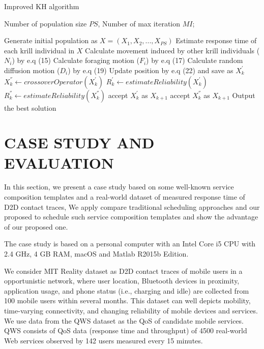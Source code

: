 \documentclass[journal]{IEEEtran}
\begin{document}
\begin{algorithm}
\caption{Improved KH algorithm}
\label{alg2}
\begin{algorithmic}[1]

\REQUIRE Number of population size $PS$, Number of max iteration $MI$;

\STATE Generate initial population as $X = (X_1, X_2, ..., X_{PS})$
\STATE Estimate response time of each krill individual in $X$
    \STATE Calculate movement induced by other krill individuals ($N_i$) by e.q (15)
    \STATE Calculate foraging motion ($F_i$) by e.q (17)
    \STATE Calculate random diffusion motion ($D_i$) by e.q (19)
    \STATE Update position by e.q (22) and save as $X_k^{'}$
    \STATE $X_k^{''} \leftarrow crossoverOperator(X_k^{'})$
    \STATE $R_k^{'} \leftarrow estimateReliability(X_k^{'})$
    \STATE $R_k^{''} \leftarrow estimateReliability(X_k^{''})$
      \STATE accept $X_k^{'}$ as $X_{k+1}$
    \ELSE
      \STATE accept $X_k^{''}$ as $X_{k+1}$
    \ENDIF
  \ENDFOR
\ENDFOR
\STATE Output the best solution
\end{algorithmic}
\end{algorithm}



\section{CASE STUDY AND EVALUATION}
In this section, we present a case study based on some well-known service composition templates and a real-world dataset of measured response time of D2D contact traces, We apply compare traditional scheduling approaches and our proposed to schedule such service composition templates and show the advantage of our proposed one.

The case study is based on a personal computer with an Intel Core i5 CPU with 2.4 GHz, 4 GB RAM, macOS and Matlab R2015b Edition.

We consider MIT Reality dataset \cite{eagle2006reality} as D2D contact traces of mobile users in a opportunistic network, where user location, Bluetooth devices in proximity, application usage, and phone status (i.e., charging and idle) are collected from 100 mobile users within several months. This dataset can well depicts mobility, time-varying connectivity, and changing reliability of mobile devices and services. 
We use data from the QWS dataset \cite{zheng2014investigating} as the QoS of candidate mobile services. 
QWS consists of QoS data (response time and throughput) of 4500 real-world Web services observed by 142 users measured every 15 minutes.
\end{document}
